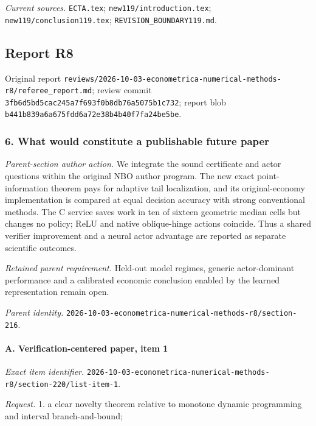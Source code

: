 \par\emph{Current sources.} \nolinkurl{ECTA.tex}; \nolinkurl{new119/introduction.tex}; \nolinkurl{new119/conclusion119.tex}; \nolinkurl{REVISION_BOUNDARY119.md}.

\subsection{Report R8}

Original report \nolinkurl{reviews/2026-10-03-econometrica-numerical-methods-r8/referee_report.md}; review commit \nolinkurl{3fb6d5bd5cac245a7f693f0b8db76a5075b1c732}; report blob \nolinkurl{b441b839a6a675fdd6a72e38b4b40f7fa24be5be}.

\subsubsection{6. What would constitute a publishable future paper}

\emph{Parent-section author action.} We integrate the sound certificate and actor questions within the original NBO author program. The new exact point-information theorem pays for adaptive tail localization, and its original-economy implementation is compared at equal decision accuracy with strong conventional methods. The C service saves work in ten of sixteen geometric median cells but changes no policy; ReLU and native oblique-hinge actions coincide. Thus a shared verifier improvement and a neural actor advantage are reported as separate scientific outcomes.

\par\emph{Retained parent requirement.} Held-out model regimes, generic actor-dominant performance and a calibrated economic conclusion enabled by the learned representation remain open.

\par\emph{Parent identity.} \nolinkurl{2026-10-03-econometrica-numerical-methods-r8/section-216}.

\paragraph{A. Verification-centered paper, item 1}

\emph{Exact item identifier.} \nolinkurl{2026-10-03-econometrica-numerical-methods-r8/section-220/list-item-1}.

\par\emph{Request.} 1. a clear novelty theorem relative to monotone dynamic programming and interval branch-and-bound;

